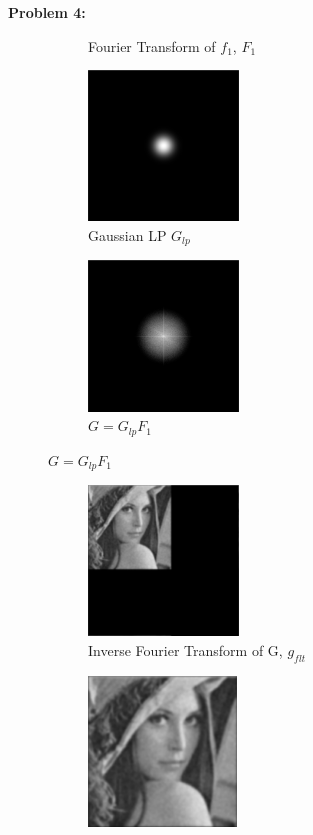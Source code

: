 \documentclass[11pt]{article}
\newenvironment{problem}[1]{\textbf{Problem #1: }}{\newpage}
\begin{document}
\begin{problem}{4}
\begin{enumerate}[label = (\alph*)]
\begin{figure}[h!]
\begin{subfigure}[h!]{.3\textwidth}
					\caption{Fourier Transform of $f_1$, $F_1$}
				\end{subfigure}
				\begin{subfigure}[h!]{.3\textwidth}
					\centering
					\includegraphics[height = 4cm]{Figures/Prob4/5}
					\caption{Gaussian LP $G_{lp}$}
				\end{subfigure}
				\begin{subfigure}[h!]{.3\textwidth}
					\centering
					\includegraphics[height = 4cm]{Figures/Prob4/6}
					\caption{$G = G_{lp}F_1$}
				\end{subfigure}
			\end{figure}
			\begin{figure}[h!]
				\centering
				\begin{subfigure}[h!]{.4\textwidth}
					\centering
					\includegraphics[height = 4cm]{Figures/Prob4/7}
					\caption{Inverse Fourier Transform of G, $g_{flt}$}
				\end{subfigure}
				\begin{subfigure}[h!]{.4\textwidth}
					\centering
					\includegraphics[height = 4cm]{Figures/Prob4/8}

\end{subfigure}
\end{figure}
\end{enumerate}
\end{problem}
\end{document}
